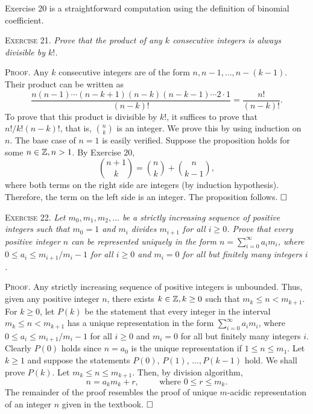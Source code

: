 \documentclass[11pt, leqno]{article}
\newcommand{\done}{\ensuremath{\hfill\square}}
\begin{document}
Exercise 20 is a straightforward computation using the definition of binomial coefficient.

\textsc{Exercise 21}. \emph{Prove that the product of any $k$ consecutive integers is always divisible by $k!$.}

\textsc{Proof}. Any $k$ consecutive integers are of the form $n, n-1, \ldots, n-(k-1)$. Their product can be written as 
\begin{displaymath}
\frac{n(n-1)\cdots (n-k+1)(n-k)(n-k-1)\cdots 2\cdot 1}{(n-k)!} = \frac{n!}{(n-k)!}.
\end{displaymath}
To prove that this product is divisible by $k!$, it suffices to prove that $n!/k!(n-k)!$, that is, $\binom{n}{k}$ is an integer. We prove this by using induction on $n$. The base case of $n=1$ is easily verified. Suppose the proposition holds for some $n\in\mathbb{Z}, n>1$. By Exercise $20$, 
\begin{displaymath}
\binom{n+1}{k} = \binom{n}{k} + \binom{n}{k-1},
\end{displaymath}
where both terms on the right side are integers (by induction hypothesis). Therefore, the term on the left side is an integer. The proposition follows. \done

\textsc{Exercise 22}. \emph{Let $m_0, m_1, m_2,\ldots$ be a strictly increasing sequence of positive integers such that $m_0=1$ and $m_i$ divides $m_{i+1}$ for all $i\geq 0$. Prove that every positive integer $n$ can be represented uniquely in the form $n = \sum_{i=0}^{\infty}a_im_i$, where $0\leq a_i \leq m_{i+1}/m_i-1$ for all $i\geq 0$ and $m_i=0$ for all but finitely many integers $i$.}

\textsc{Proof}. Any strictly increasing sequence of positive integers is unbounded. Thus, given any positive integer $n$, there exists $k\in\mathbb{Z}, k\geq 0$ such that $m_k \leq n < m_{k+1}$. For $k\geq 0$, let $P(k)$ be the statement that every integer in the interval $m_k \leq n < m_{k+1}$ has a unique representation in the form $\sum_{i=0}^{\infty} a_im_i$, where $0\leq a_i \leq m_{i+1}/m_i-1$ for all $i\geq 0$ and $m_i=0$ for all but finitely many integers $i$. Clearly $P(0)$ holds since $n=a_0$ is the unique representation if $1 \leq n \leq m_1$. Let $k\geq 1$ and suppose the statements $P(0)$, $P(1)$, $\ldots, P(k-1)$ hold. We shall prove $P(k)$. Let $m_k \leq n \leq m_{k+1}$. Then, by division algorithm, 
\begin{displaymath}
n = a_k m_k + r, \hspace{1cm} \text{where } 0\leq r \leq m_k.
\end{displaymath}
The remainder of the proof resembles the proof of unique $m$-acidic representation of an integer $n$ given in the textbook. \done
\end{document}
